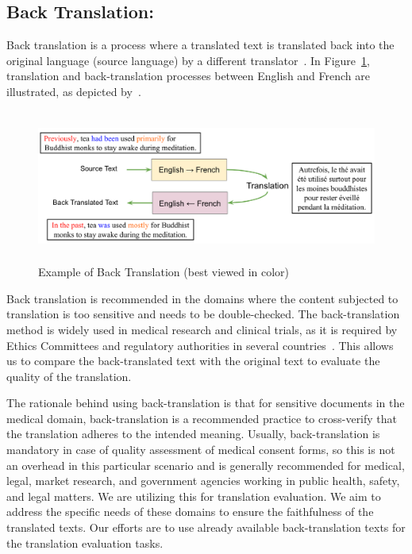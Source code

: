 \documentclass[runningheads]{llncs}
\begin{document}
\subsection{Back Translation: }\label{BTintro}

Back translation is a process where a translated text is translated back into the original language (source language) by a different translator~\cite{whatBT}. In Figure~\ref{figureBT}, translation and back-translation processes between English and French are illustrated, as depicted by~\cite{btfigure}.

\begin{figure}[h]
  \centering
  \includegraphics[height=5cm,width=1.0\linewidth]{figures/back-translation.png}
  \caption{Example of Back Translation (best viewed in color)}
\label{figureBT}
\end{figure}

Back translation is recommended in the domains where the content subjected to translation is too sensitive and needs to be double-checked. The back-translation method is widely used in medical research and clinical trials, as it is required by Ethics Committees and regulatory authorities in several countries~\cite{whyBT}. This allows us to compare the back-translated text with the original text to evaluate the quality of the translation.  

The rationale behind using back-translation is that for sensitive documents in the medical domain, back-translation is a recommended practice to cross-verify that the translation adheres to the intended meaning. Usually, back-translation is mandatory in case of quality assessment of medical consent forms, so this is not an overhead in this particular scenario and is generally recommended for medical, legal, market research, and government agencies working in public health, safety, and legal matters. We are utilizing this for translation evaluation. We aim to address the specific needs of these domains to ensure the faithfulness of the translated texts. Our efforts are to use already available back-translation texts for the translation evaluation tasks. 
\end{document}
